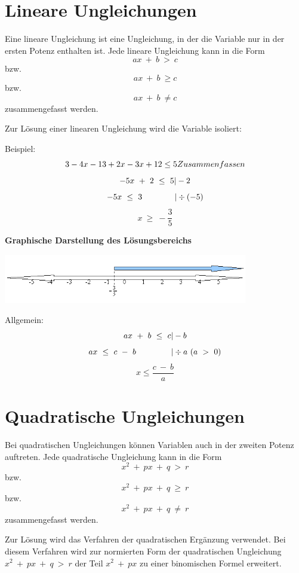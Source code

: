 \section{Lineare Ungleichungen}

Eine lineare Ungleichung ist eine Ungleichung, in der die Variable nur in der ersten Potenz enthalten ist. Jede lineare Ungleichung kann in die Form \\ 
\[ax \ + \ b \ > \ c \] bzw. 
\[ax \ + \ b \ \geq c \] bzw. 
\[ax \ + \ b \ \neq c \] 
zusammengefasst werden.

Zur Lösung einer linearen Ungleichung wird die Variable isoliert:

Beispiel:
\[3 - 4x - 13 + 2x - 3x + 12 \leq 5 \\ Zusammenfassen \]
\[-5 x \ + \ 2 \ \leq \ 5\\ |-2 \]
\[-5x \ \leq \ 3 \\ ~~~~~~~~~~~~| \div (-5) \]
\[ x \ \geq \ - \frac 3 5\]

\Large \bfseries {Graphische Darstellung des Lösungsbereichs}
\mdseries 	\normalsize
\begin{center}
\includegraphics[width=0.8\textwidth]{img/LBer1.png}
\end{center}

Allgemein:
\[ax \ + \ b \ \leq \ c \\ |-b \]
\[ax \ \leq \ c \ - \ b \\ ~~~~~~~~~~~~~|\div a ~(a \ > \ 0) \]
\[x \leq \frac {c \ - \ b} a\]

\section{Quadratische Ungleichungen}

Bei quadratischen Ungleichungen können Variablen auch in der zweiten Potenz
auftreten. Jede quadratische Ungleichung kann in die Form \\
\[x^2 \ + \ px \ + \ q \ > \ r \]
bzw. 
\[x^2 \ + \ px \ + \ q \ \geq \ r \]
bzw.
\[x^2 \ + \ px \ + \ q \ \neq \ r \]
zusammengefasst werden.

Zur Lösung wird das Verfahren der quadratischen Ergänzung verwendet.
Bei diesem Verfahren wird zur normierten Form der quadratischen Ungleichung $ x^2 \ + \ px \ + \ q \ > \ r $ der Teil $ x^2 \ + \ px $ zu einer binomischen Formel erweitert.

